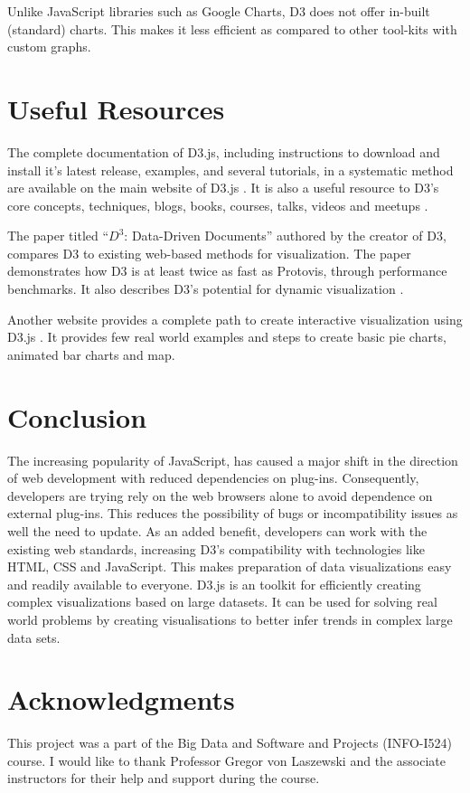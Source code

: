 \documentclass[9pt,twocolumn,twoside]{../../styles/osajnl}
\begin{document}
Unlike JavaScript libraries such as Google Charts, D3 does not offer in-built (standard) charts. This makes it less efficient as compared to other tool-kits with custom graphs.

\section{Useful Resources}
The complete documentation of D3.js, including instructions to download and install it's latest release, examples, and several tutorials, in a systematic method are available on the main website of D3.js \cite{www-d3}. It is also a useful resource to D3's core concepts, techniques, blogs, books, courses, talks, videos and meetups \cite{www-tut}.

The paper titled “$D^3$: Data-Driven Documents” authored by the creator of D3, compares D3 to existing web-based methods for visualization.
\CE
{}The paper demonstrates how D3 is at least twice as fast as Protovis, through performance benchmarks. It also describes D3’s potential for dynamic visualization \cite{paper-d3}.

Another website provides a complete path to create interactive visualization using D3.js \cite{www-av}. It provides few real world examples and steps to create basic pie charts, animated bar charts and map.

\section{Conclusion}
The increasing popularity of JavaScript, has caused a major shift in the direction of web development with reduced dependencies on plug-ins. Consequently, developers are trying rely on the web browsers alone to avoid dependence on external plug-ins. This reduces the possibility of bugs or incompatibility issues as well the need to update. As an added benefit, developers can work with the existing web standards, increasing D3’s compatibility with technologies like HTML, CSS and JavaScript. This makes preparation of data visualizations easy and readily available to everyone. D3.js is an toolkit for efficiently creating complex visualizations based on large datasets. It can be used for solving real world problems by creating visualisations to better infer trends in complex large data sets.

\section{Acknowledgments}
This project was a part of the Big Data and Software and Projects (INFO-I524) course. I would like to thank Professor Gregor von Laszewski and the associate instructors for their help and support during the course.



\end{document}
